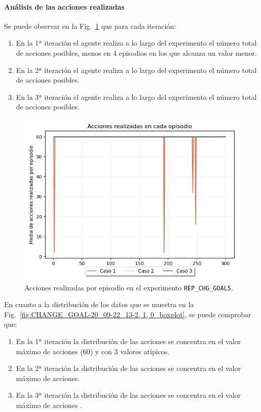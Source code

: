 \paragraph{Análisis de las acciones realizadas}

Se puede observar en la Fig.~\ref{fig:CHANGE_GOAL-20_09-22_13-2, 1, 0_acciones} que para cada iteración: 
\begin{enumerate}
    \item En la 1ª iteración el agente realiza a lo largo del experimento el número total de acciones posibles, menos en 4 episodios en los que alcanza un valor menor. 
    \item En la 2ª iteración el agente realiza a lo largo del experimento el número total de acciones posibles. 
    \item En la 3ª iteración el agente realiza a lo largo del experimento el número total de acciones posibles. 
\end{enumerate}
  
\begin{figure}
    \centering
    \includegraphics[scale=0.4]{cap5_experimentacion/images/CHANGE_GOAL-20_09-22_13-2, 1, 0_acciones.png}
    \caption{Acciones realizadas por episodio en el experimento \texttt{REP\_CHG\_GOAL5}.}
    \label{fig:CHANGE_GOAL-20_09-22_13-2, 1, 0_acciones}
\end{figure}

En cuanto a la distribución de los datos que se muestra en la Fig.~\ref{fig:CHANGE_GOAL-20_09-22_13-2, 1, 0_boxplot}, se puede comprobar que:
\begin{enumerate}
    \item En la 1ª iteración la distribución de las acciones se concentra en el valor máximo de acciones (60) y con 3 valores atípicos.
    \item En la 2ª iteración la distribución de las acciones se concentra en el valor máximo de acciones.
    \item En la 3ª iteración la distribución de las acciones se concentra en el valor máximo de acciones .
\end{enumerate} 
 
